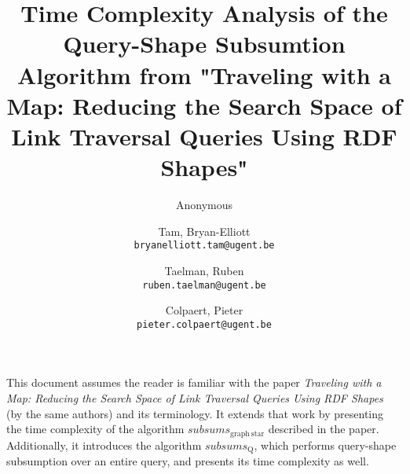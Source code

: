 \documentclass{article}
\title{Time Complexity Analysis of the Query-Shape Subsumtion Algorithm from "Traveling with a Map: Reducing the Search Space of Link Traversal Queries Using RDF Shapes"}
\author{Anonymous}
\author{Tam, Bryan-Elliott \\
        \texttt{bryanelliott.tam@ugent.be}
        \and 
        Taelman, Ruben \\
        \texttt{ruben.taelman@ugent.be}
        \and
        Colpaert, Pieter \\
        \texttt{pieter.colpaert@ugent.be}
    }
\begin{document}
\maketitle

This document assumes the reader is familiar with the paper \textit{Traveling with a Map: Reducing the Search Space of Link Traversal Queries Using RDF Shapes} (by the same authors) and its terminology.
It extends that work by presenting the time complexity of the algorithm $subsums_{\mathrm{graph\ star}}$ described in the paper.
Additionally, it introduces the algorithm $subsums_{\mathrm{Q}}$, which performs query-shape subsumption over an entire query, and presents its time complexity as well.


\end{document}
